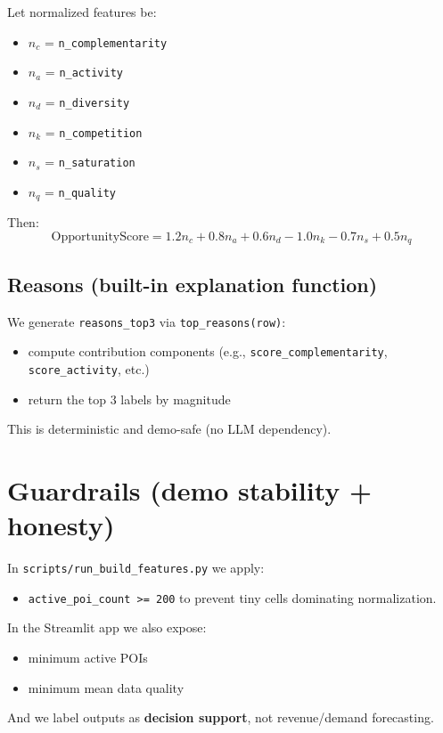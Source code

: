 \documentclass[11pt]{article}
\begin{document}
\noindent Let normalized features be:
\begin{itemize}
  \item $n_c$ = \texttt{n\_complementarity}
  \item $n_a$ = \texttt{n\_activity}
  \item $n_d$ = \texttt{n\_diversity}
  \item $n_k$ = \texttt{n\_competition}
  \item $n_s$ = \texttt{n\_saturation}
  \item $n_q$ = \texttt{n\_quality}
\end{itemize}

\noindent Then:
\[
\text{OpportunityScore}
=
1.2n_c
+0.8n_a
+0.6n_d
-1.0n_k
-0.7n_s
+0.5n_q
\]

\subsection{Reasons (built-in explanation function)}
We generate \texttt{reasons\_top3} via \texttt{top\_reasons(row)}:
\begin{itemize}
  \item compute contribution components (e.g., \texttt{score\_complementarity}, \texttt{score\_activity}, etc.)
  \item return the top 3 labels by magnitude
\end{itemize}
This is deterministic and demo-safe (no LLM dependency).

\section{Guardrails (demo stability + honesty)}
\noindent In \texttt{scripts/run\_build\_features.py} we apply:
\begin{itemize}
  \item \texttt{active\_poi\_count >= 200} to prevent tiny cells dominating normalization.
\end{itemize}

\noindent In the Streamlit app we also expose:
\begin{itemize}
  \item minimum active POIs
  \item minimum mean data quality
\end{itemize}

\noindent And we label outputs as \textbf{decision support}, not revenue/demand forecasting.
\end{document}

